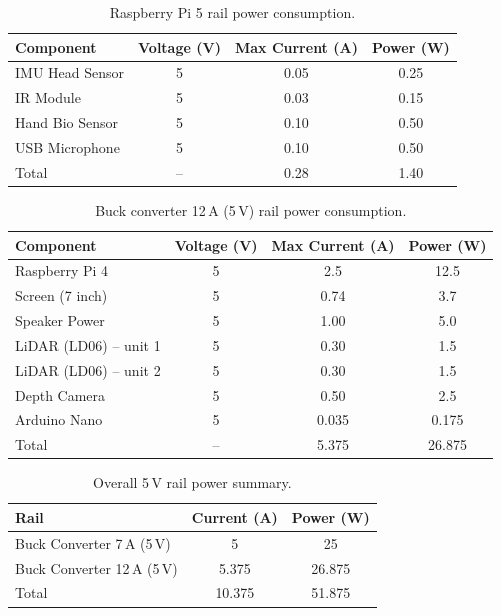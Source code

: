 \begin{table}[H]
\centering
\caption{Raspberry Pi 5 rail power consumption.}
\label{tab:power-rpi5-rail}
\begin{tabular}{l c c c}
\hline
Component & Voltage (V) & Max Current (A) & Power (W) \\
\hline
IMU Head Sensor & 5 & 0.05 & 0.25 \\
IR Module & 5 & 0.03 & 0.15 \\
Hand Bio Sensor & 5 & 0.10 & 0.50 \\
USB Microphone & 5 & 0.10 & 0.50 \\
\hline
Total & -- & 0.28 & 1.40 \\
\hline
\end{tabular}
\end{table}

\begin{table}[H]
\centering
\caption{Buck converter 12\,A (5\,V) rail power consumption.}
\label{tab:power-12a}
\begin{tabular}{l c c c}
\hline
Component & Voltage (V) & Max Current (A) & Power (W) \\
\hline
Raspberry Pi 4 & 5 & 2.5 & 12.5 \\
Screen (7 inch) & 5 & 0.74 & 3.7 \\
Speaker Power & 5 & 1.00 & 5.0 \\
LiDAR (LD06) -- unit 1 & 5 & 0.30 & 1.5 \\
LiDAR (LD06) -- unit 2 & 5 & 0.30 & 1.5 \\
Depth Camera & 5 & 0.50 & 2.5 \\
Arduino Nano & 5 & 0.035 & 0.175 \\
\hline
Total & -- & 5.375 & 26.875 \\
\hline
\end{tabular}
\end{table}

\begin{table}[H]
\centering
\caption{Overall 5\,V rail power summary.}
\label{tab:power-summary}
\begin{tabular}{l c c}
\hline
Rail & Current (A) & Power (W) \\
\hline
Buck Converter 7\,A (5\,V) & 5 & 25 \\
Buck Converter 12\,A (5\,V) & 5.375 & 26.875 \\
\hline
Total & 10.375 & 51.875 \\
\hline
\end{tabular}
\end{table}

